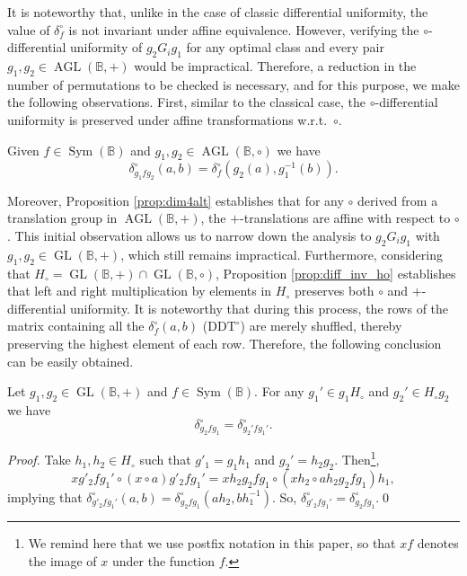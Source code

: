 \documentclass[runningheads,a4paper,english]{llncs}
\DeclareMathOperator{\gl}{GL}
\DeclareMathOperator{\GL}{GL}
\DeclareMathOperator{\AGL}{AGL}
\DeclareMathOperator{\sym}{Sym}
\newcommand{\ho}{H_\circ}
\begin{document}
It is noteworthy that, unlike in the case of classic differential uniformity, the value of $\delta^\circ_f$ is not invariant under affine equivalence. However, verifying the $\circ$-differential uniformity of $g_2  G_i  g_1$ for any optimal class and every pair $g_1, g_2 \in \AGL(\mathbb B,+)$ would be impractical. 
Therefore, a reduction in the number of permutations to be checked is necessary, and for this purpose, we make the following observations.
First, similar to the classical case, the $\circ$-differential uniformity is preserved under affine transformations w.r.t.\ $\circ$.
\begin{proposition}
	\label{prop:diff_inv_ho}
 Given $f \in \sym(\mathbb B)$ and $g_1, g_2 \in  \AGL(\mathbb B, \circ)$ we have
	\[ \delta_{g_1  f  g_2}^{\circ}(a,b)= \delta_f^{\circ}(g_2(a),g_1^{-1}(b)). \]
\end{proposition}
Moreover, Proposition \ref{prop:dim4alt} establishes that for any $\circ$ derived from a translation group in $\AGL(\mathbb B,+)$, the $+$-translations are affine with respect to $\circ$.
This initial observation allows us to narrow down the analysis to $g_2  G_i  g_1$ with $g_1, g_2 \in \GL(\mathbb B,+)$, which still remains impractical. Furthermore, considering that $\ho = \gl(\mathbb B, +) \cap \GL(\mathbb B, \circ)$, Proposition \ref{prop:diff_inv_ho} establishes that left and right multiplication by elements in $\ho$ preserves both $\circ$ and $+$-differential uniformity. 
It is noteworthy that during this process, the rows of the matrix containing all the $\delta^\circ_f(a,b)$ ($\mathrm{DDT}^\circ$) are merely shuffled, thereby preserving the highest element of each row. 
Therefore, the following conclusion can be easily obtained.
\begin{proposition}
    Let $g_1, g_2 \in \gl(\mathbb B,+)$ and $f\in \sym(\mathbb B)$.  For any $g_1' \in g_1 H_\circ $ and $g_2' \in H_\circ g_2$ we have \[\delta^\circ_{g_2 f g_1}=\delta^\circ_{g_2' f g_1'}.\]
\end{proposition}
\begin{proof}
\setcounter{footnote}{0}
  Take $h_1, h_2\in H_\circ$ such that $g'_1=g_1 h_1$ and $g_2'=h_2 g_2$. Then\footnote{We remind here that we use postfix notation in this paper, so that $x f$ denotes the image of $x$ under the function $f$.},
    \[
   x g'_2 f g_1' \circ  (x \circ a)g'_2 f g_1'= xh_2  g_2 f g_1 \circ  (xh_2 \circ ah_2g_2 f g_1)h_1,
    \]
   implying that $\delta^\circ_{g'_2 f g_1'}(a,b)=\delta^\circ_{g_2 f g_1}(ah_2,bh_1^{-1})$. So, $\delta^\circ_{g'_2 f g_1'}=\delta^\circ_{g_2 f g_1}$.\qed
\end{proof}
\end{document}
